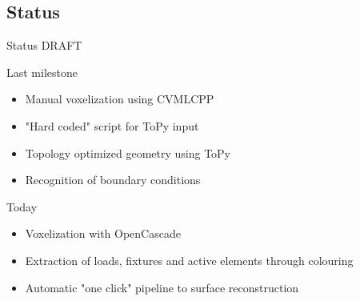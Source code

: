 \subsection{Status}
\begin{frame}{Status DRAFT}
\begin{block}{Last milestone}
\begin{itemize}
	\item[\textcolor{green}{\Checkmark}] Manual voxelization using CVMLCPP
	\item[\textcolor{green}{\Checkmark}] "Hard coded" script for ToPy input
	\item[\textcolor{green}{\Checkmark}] Topology optimized geometry using ToPy
	\item[\textcolor{red}{\XSolidBrush}] Recognition of boundary conditions
\end{itemize}
\end{block}
\begin{block}{Today}
\begin{itemize}
	\item[\textcolor{green}{\Checkmark}] Voxelization with OpenCascade
	\item[\textcolor{green}{\Checkmark}] Extraction of loads, fixtures and active elements through colouring
	\item[\textcolor{green}{\Checkmark}] Automatic "one click" pipeline to surface reconstruction
\end{itemize}
\end{block}
\end{frame}

